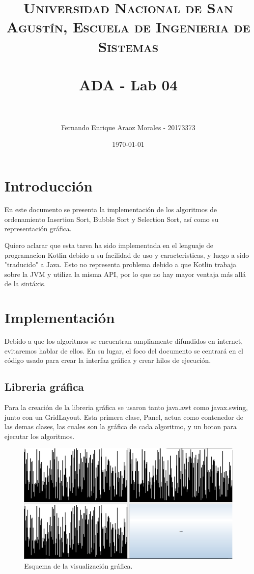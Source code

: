 \documentclass[paper=a4, fontsize=11pt]{scrartcl} %
\title{	
\normalfont \normalsize 
\textsc{Universidad Nacional de San Agustín, Escuela de Ingenieria de Sistemas} \\ [25pt] %
\horrule{0.5pt} \\[0.4cm] %
\huge ADA - Lab 04 \\ %
\horrule{2pt} \\[0.5cm] %
}
\author{Fernando Enrique Araoz Morales - 20173373} %
\date{\normalsize\today} %
\numberwithin{equation}{section} %
\numberwithin{figure}{section} %
\numberwithin{table}{section} %
\begin{document}
\maketitle %


\section{Introducción}\label{sec:introducción}

En este documento se presenta la implementación de los algoritmos de ordenamiento Insertion Sort, Bubble
Sort y Selection Sort, así como su representación gráfica.


Quiero aclarar que esta tarea ha sido implementada en el lenguaje de programacíon Kotlin debido a su
facilidad de uso y caracteristicas, y luego a sido "traducido" a Java. Esto no representa problema
debido a que Kotlin trabaja sobre la JVM y utiliza la misma API, por lo que no hay mayor ventaja
más allá de la sintáxis.


\section{Implementación}\label{sec:implementación}

Debido a que los algoritmos se encuentran ampliamente difundidos en internet, evitaremos hablar de ellos.
En su lugar, el foco del documento se centrará en el código usado para crear la interfaz gráfica y crear
hilos de ejecución.

\subsection{Libreria gráfica}\label{subsec:libreria-gráfica}

Para la creación de la libreria gráfica se usaron tanto java.awt como javax.swing, junto con un GridLayout.
Esta primera clase, Panel, actua como contenedor de las demas clases, las cuales son la gráfica de cada
algoritmo, y un boton para ejecutar los algoritmos.

\begin{figure}
    \includegraphics[width=\linewidth]{Layout.png}
    \caption{Esquema de la visualización gráfica.}
\end{figure}
\end{document}
